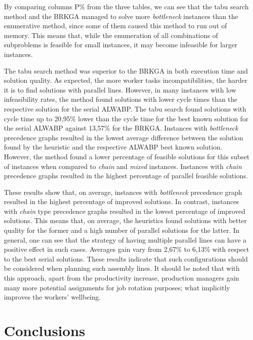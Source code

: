 \documentclass{singlecol-new}
\begin{document}
By comparing columns P\% from the three tables, we can see that the tabu search method and the BRKGA managed to solve more \textit{bottleneck} instances than the enumerative method, since some of them caused this method to run out of memory. This means that, while the enumeration of all combinations of subproblems is feasible for small instances, it may become infeasible for larger instances.

The tabu search method was superior to the BRKGA in both execution time and solution quality. As expected, the more worker tasks incompatibilities, the harder it is to find solutions with parallel lines. However, in many instances with low infeasibility rates, the method found solutions with lower cycle times than the respective solution for the serial ALWABP. The tabu search found solutions with cycle time up to 20,95\% lower than the cycle time for the best known solution for the serial ALWABP against 13,57\% for the BRKGA. Instances with \textit{bottleneck} precedence graphs resulted in the lowest average difference between the solution found by the heuristic and the respective ALWABP best known solution. However, the method found a lower percentage of feasible solutions for this subset of instances when compared to \textit{chain} and \textit{mixed} instances. Instances with \textit{chain} precedence graphs resulted in the highest percentage of parallel feasible solutions.

These results show that, on average, instances with \textit{bottleneck} precedence graph resulted in the highest percentage of improved solutions. In contrast, instances with \textit{chain} type precedence graphs resulted in the lowest percentage of improved solutions. This means that, on average, the heuristics found solutions with better quality for the former and a high number of parallel solutions for the latter. In general, one can see that the strategy of having multiple parallel lines can have a positive effect in such cases. Averages gain vary from 2,67\% to 6,13\% with respect to the best serial solutions. These results indicate that such configurations should be considered when planning such assembly lines. It should be noted that with this approach, apart from the productivity increase, production managers gain many more potential assignments for job rotation purposes; what implicitly improves the workers' wellbeing.

\section{Conclusions}\label{conclusions}
\end{document}
